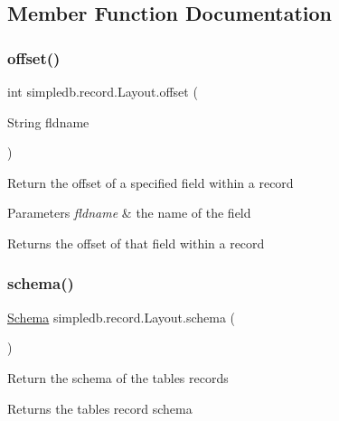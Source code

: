 \subsection{Member Function Documentation}
\mbox{\label{classsimpledb_1_1record_1_1Layout_abfcef0e0b363f1d075a810bec77ffe57}} 
\subsubsection{\texorpdfstring{offset()}{offset()}}
{\footnotesize\ttfamily int simpledb.\+record.\+Layout.\+offset (\begin{DoxyParamCaption}\item[{String}]{fldname }\end{DoxyParamCaption})\hspace{0.3cm}{\ttfamily [inline]}}

Return the offset of a specified field within a record 
\begin{DoxyParams}{Parameters}
{\em fldname} & the name of the field \\
\hline
\end{DoxyParams}
\begin{DoxyReturn}{Returns}
the offset of that field within a record 
\end{DoxyReturn}
\mbox{\label{classsimpledb_1_1record_1_1Layout_ab647a930df39704c30501af29df28349}} 
\subsubsection{\texorpdfstring{schema()}{schema()}}
{\footnotesize\ttfamily \hyperlink{classsimpledb_1_1record_1_1Schema}{Schema} simpledb.\+record.\+Layout.\+schema (\begin{DoxyParamCaption}{ }\end{DoxyParamCaption})\hspace{0.3cm}{\ttfamily [inline]}}

Return the schema of the table\textquotesingle{}s records \begin{DoxyReturn}{Returns}
the table\textquotesingle{}s record schema 
\end{DoxyReturn}
\mbox{\label{classsimpledb_1_1record_1_1Layout_a1e5e630fd8d2f2695136d9d80fb14b5b}} 
